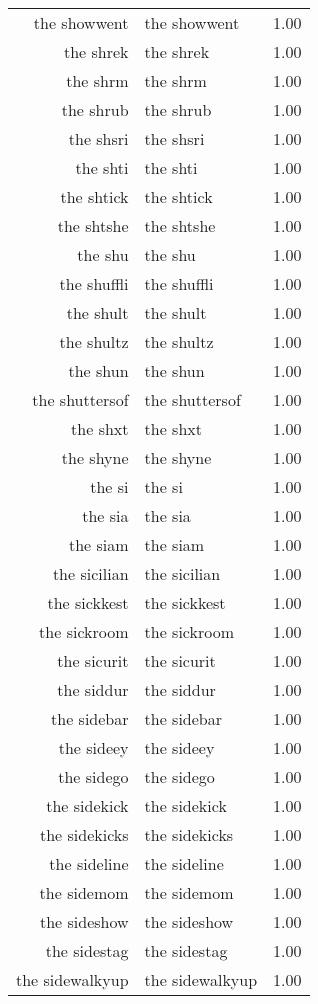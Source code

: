 \begin{table}[ht]
\begin{tabular}{rlr}
  the showwent & the showwent & 1.00 \\ 
  the shrek & the shrek & 1.00 \\ 
  the shrm & the shrm & 1.00 \\ 
  the shrub & the shrub & 1.00 \\ 
  the shsri & the shsri & 1.00 \\ 
  the shti & the shti & 1.00 \\ 
  the shtick & the shtick & 1.00 \\ 
  the shtshe & the shtshe & 1.00 \\ 
  the shu & the shu & 1.00 \\ 
  the shuffli & the shuffli & 1.00 \\ 
  the shult & the shult & 1.00 \\ 
  the shultz & the shultz & 1.00 \\ 
  the shun & the shun & 1.00 \\ 
  the shuttersof & the shuttersof & 1.00 \\ 
  the shxt & the shxt & 1.00 \\ 
  the shyne & the shyne & 1.00 \\ 
  the si & the si & 1.00 \\ 
  the sia & the sia & 1.00 \\ 
  the siam & the siam & 1.00 \\ 
  the sicilian & the sicilian & 1.00 \\ 
  the sickkest & the sickkest & 1.00 \\ 
  the sickroom & the sickroom & 1.00 \\ 
  the sicurit & the sicurit & 1.00 \\ 
  the siddur & the siddur & 1.00 \\ 
  the sidebar & the sidebar & 1.00 \\ 
  the sideey & the sideey & 1.00 \\ 
  the sidego & the sidego & 1.00 \\ 
  the sidekick & the sidekick & 1.00 \\ 
  the sidekicks & the sidekicks & 1.00 \\ 
  the sideline & the sideline & 1.00 \\ 
  the sidemom & the sidemom & 1.00 \\ 
  the sideshow & the sideshow & 1.00 \\ 
  the sidestag & the sidestag & 1.00 \\ 
  the sidewalkyup & the sidewalkyup & 1.00 \\ 

\end{tabular}
\end{table}
